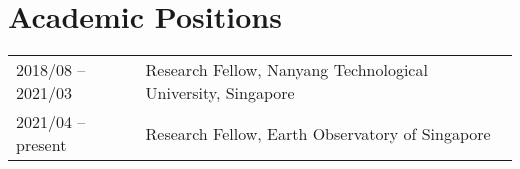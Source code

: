 \section*{Academic Positions}
\begin{tabular}{p{} p{}}
2018/08 -- 2021/03 & Research Fellow, Nanyang Technological University, Singapore \\
2021/04 -- present & Research Fellow, Earth Observatory of Singapore \\
\end{tabular}

